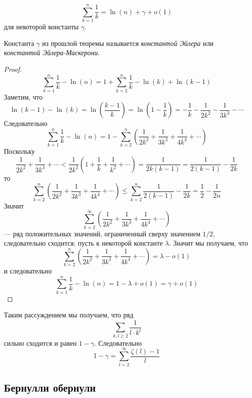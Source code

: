 \documentclass[12pt,a4paper]{article}
\begin{document}
    \begin{theorem}
        \[\sum_{k=1}^n \frac{1}{k} = \ln(n) + \gamma + o(1)\]
        для некоторой константы $\gamma$.
    \end{theorem}

    \begin{definition}
        Константа $\gamma$ из прошлой теоремы называется \emph{константой Эйлера} или \emph{константой Эйлера-Маскерони}.
    \end{definition}

    \begin{proof}
        \[\sum_{k=1}^n \frac{1}{k} - \ln(n) = 1 + \sum_{k=2}^n \frac{1}{k} - \ln(k) + \ln(k-1)\]
        Заметим, что
        \[\ln(k-1) - \ln(k) = \ln\left(\frac{k-1}{k}\right) = \ln\left(1-\frac{1}{k}\right) = -\frac{1}{k} - \frac{1}{2k^2} - \frac{1}{3k^3} - \cdots\]
        Следовательно
        \[\sum_{k=1}^n \frac{1}{k} - \ln(n) = 1 - \sum_{k=2}^n \left(\frac{1}{2k^2} + \frac{1}{3k^3} + \frac{1}{4k^4} + \cdots\right)\]
        Поскольку
        \[\frac{1}{2k^2} + \frac{1}{3k^3} + \cdots < \frac{1}{2k^2} \left(1 + \frac{1}{k} + \frac{1}{k^2} + \cdots\right) = \frac{1}{2k(k-1)} = \frac{1}{2(k-1)} - \frac{1}{2k}\]
        то
        \[\sum_{k=2}^n \left(\frac{1}{2k^2} + \frac{1}{3k^3} + \frac{1}{4k^4} + \cdots\right) \leqslant \sum_{k=2}^n \frac{1}{2(k-1)} - \frac{1}{2k} = \frac{1}{2} - \frac{1}{2n}\]
        Значит
        \[\sum_{k=2}^\infty \left(\frac{1}{2k^2} + \frac{1}{3k^3} + \frac{1}{4k^4} + \cdots\right)\]
        --- ряд положительных значений, ограниченный сверху значением $1/2$, следовательно сходится; пусть к некоторой константе $\lambda$. Значит мы получаем, что
        \[\sum_{k=2}^n \left(\frac{1}{2k^2} + \frac{1}{3k^3} + \frac{1}{4k^4} + \cdots\right) = \lambda - o(1)\]
        и следовательно
        \[\sum_{k=1}^n \frac{1}{k} - \ln(n) = 1 - \lambda + o(1) = \gamma + o(1)\]
    \end{proof}

    \begin{remark}
        Таким рассуждением мы получаем, что ряд
        \[\sum_{k, l \geqslant 2} \frac{1}{l \cdot k^l}\]
        сильно сходится и равен $1 - \gamma$. Следовательно
        \[1 - \gamma = \sum_{l=2}^\infty \frac{\zeta(l) - 1}{l}\]
    \end{remark}

    \subsection{Бернулли обернули}
\end{document}
